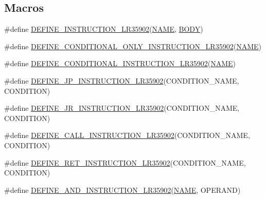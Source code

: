 \subsection*{Macros}
\begin{DoxyCompactItemize}
\item 
\#define \mbox{\hyperlink{isa-lr35902_8c_a3128fc43c5d01e8b51f67901c0b4b5ef}{D\+E\+F\+I\+N\+E\+\_\+\+I\+N\+S\+T\+R\+U\+C\+T\+I\+O\+N\+\_\+\+L\+R35902}}(\mbox{\hyperlink{inflate_8h_a164ea0159d5f0b5f12a646f25f99eceaa67bc2ced260a8e43805d2480a785d312}{N\+A\+ME}},  \mbox{\hyperlink{gzlog_8c_aa6bdf6a6d9916c343e1e17774d84a156}{B\+O\+DY}})
\item 
\#define \mbox{\hyperlink{isa-lr35902_8c_a8af6900f7950035e91a4d4cf13ec743e}{D\+E\+F\+I\+N\+E\+\_\+\+C\+O\+N\+D\+I\+T\+I\+O\+N\+A\+L\+\_\+\+O\+N\+L\+Y\+\_\+\+I\+N\+S\+T\+R\+U\+C\+T\+I\+O\+N\+\_\+\+L\+R35902}}(\mbox{\hyperlink{inflate_8h_a164ea0159d5f0b5f12a646f25f99eceaa67bc2ced260a8e43805d2480a785d312}{N\+A\+ME}})
\item 
\#define \mbox{\hyperlink{isa-lr35902_8c_a562e2fa9f060e6a136f77b21a02c6f6c}{D\+E\+F\+I\+N\+E\+\_\+\+C\+O\+N\+D\+I\+T\+I\+O\+N\+A\+L\+\_\+\+I\+N\+S\+T\+R\+U\+C\+T\+I\+O\+N\+\_\+\+L\+R35902}}(\mbox{\hyperlink{inflate_8h_a164ea0159d5f0b5f12a646f25f99eceaa67bc2ced260a8e43805d2480a785d312}{N\+A\+ME}})
\item 
\#define \mbox{\hyperlink{isa-lr35902_8c_af8b9399fa7bfddb7b4a29a7808ca6c67}{D\+E\+F\+I\+N\+E\+\_\+\+J\+P\+\_\+\+I\+N\+S\+T\+R\+U\+C\+T\+I\+O\+N\+\_\+\+L\+R35902}}(C\+O\+N\+D\+I\+T\+I\+O\+N\+\_\+\+N\+A\+ME,  C\+O\+N\+D\+I\+T\+I\+ON)
\item 
\#define \mbox{\hyperlink{isa-lr35902_8c_a9767e2d15ec9fe3eb8b439485316616a}{D\+E\+F\+I\+N\+E\+\_\+\+J\+R\+\_\+\+I\+N\+S\+T\+R\+U\+C\+T\+I\+O\+N\+\_\+\+L\+R35902}}(C\+O\+N\+D\+I\+T\+I\+O\+N\+\_\+\+N\+A\+ME,  C\+O\+N\+D\+I\+T\+I\+ON)
\item 
\#define \mbox{\hyperlink{isa-lr35902_8c_a1aec8b657e19acd0c93a5327bfbc0326}{D\+E\+F\+I\+N\+E\+\_\+\+C\+A\+L\+L\+\_\+\+I\+N\+S\+T\+R\+U\+C\+T\+I\+O\+N\+\_\+\+L\+R35902}}(C\+O\+N\+D\+I\+T\+I\+O\+N\+\_\+\+N\+A\+ME,  C\+O\+N\+D\+I\+T\+I\+ON)
\item 
\#define \mbox{\hyperlink{isa-lr35902_8c_a41a05eae4ccf30d568a134fd8f774a01}{D\+E\+F\+I\+N\+E\+\_\+\+R\+E\+T\+\_\+\+I\+N\+S\+T\+R\+U\+C\+T\+I\+O\+N\+\_\+\+L\+R35902}}(C\+O\+N\+D\+I\+T\+I\+O\+N\+\_\+\+N\+A\+ME,  C\+O\+N\+D\+I\+T\+I\+ON)
\item 
\#define \mbox{\hyperlink{isa-lr35902_8c_ae1080a83b34389ed2ca28d988d21fe00}{D\+E\+F\+I\+N\+E\+\_\+\+A\+N\+D\+\_\+\+I\+N\+S\+T\+R\+U\+C\+T\+I\+O\+N\+\_\+\+L\+R35902}}(\mbox{\hyperlink{inflate_8h_a164ea0159d5f0b5f12a646f25f99eceaa67bc2ced260a8e43805d2480a785d312}{N\+A\+ME}},  O\+P\+E\+R\+A\+ND)

\end{DoxyCompactItemize}
